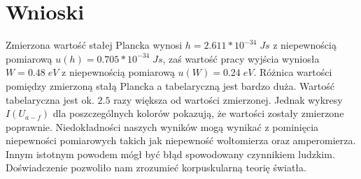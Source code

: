 \documentclass[12pt]{article}
\begin{document}
\section{Wnioski}
Zmierzona wartość stałej Plancka wynosi $h=2.611*10^{-34}\;Js$ z niepewnością pomiarową \newline $u(h)=0.705*10^{-34}\;Js$, zaś wartość pracy wyjścia wyniosła $W=0.48\;eV$ z niepewnością pomiarową $u(W)=0.24\;eV$. Różnica wartości pomiędzy zmierzoną stałą Plancka a tabelaryczną jest bardzo duża. Wartość tabelaryczna jest ok. $2.5$ razy większa od wartości zmierzonej. Jednak wykresy $I(U_{a-f})$ dla poszczególnych kolorów pokazują, że wartości zostały zmierzone poprawnie. Niedokładności naszych wyników mogą wynikać z pominięcia niepewności pomiarowych takich jak niepewność woltomierza oraz amperomierza. Innym istotnym powodem mógł być błąd spowodowany czynnikiem ludzkim. Doświadczenie pozwoliło nam zrozumieć korpuskularną teorię światła.
\end{document}
